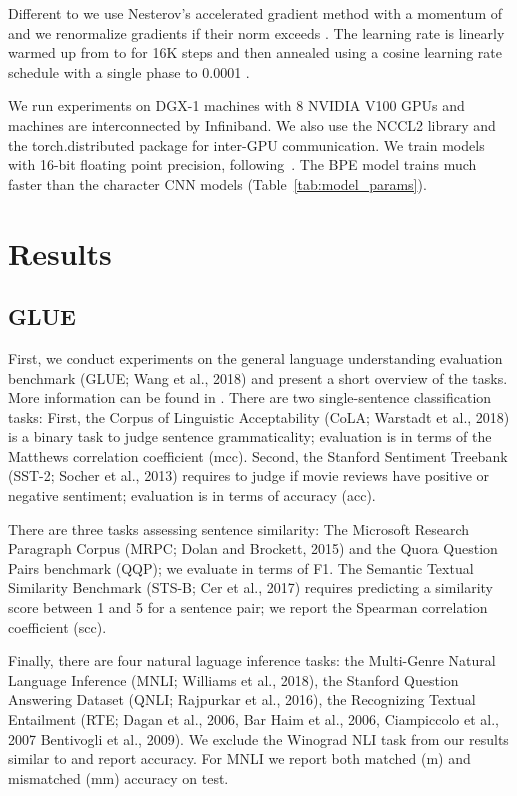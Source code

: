\documentclass[11pt,a4paper]{article}
\begin{document}
Different to \citet{vaswani2017transformer} we use Nesterov's accelerated gradient method \citep{sutskever2013icml} with a momentum of  and we renormalize gradients if their norm exceeds  \citep{pascanu2013difficulty}.
The learning rate is linearly warmed up from  to  for 16K steps and then annealed using a cosine learning rate schedule with a single phase to 0.0001 \citep{cosine}.

We run experiments on DGX-1 machines with 8 NVIDIA V100 GPUs and machines are interconnected by Infiniband.
We also use the NCCL2 library and the torch.distributed package for inter-GPU communication.
We train models with 16-bit floating point precision, following~\citet{ott2018scaling}.
The BPE model trains much faster than the character CNN models (Table~\ref{tab:model_params}).


\section{Results}
     
\subsection{GLUE}
\label{sec:glue}

First, we conduct experiments on the general language understanding evaluation benchmark (GLUE; Wang et al., 2018)\nocite{wang2018glue} and present a short overview of the tasks. More information can be found in \citet{wang2018glue}. 
There are two single-sentence classification tasks: 
First, the Corpus of Linguistic Acceptability (CoLA; Warstadt et al., 2018)\nocite{warstadt2018cola} is a binary task to judge sentence grammaticality; evaluation is in terms of the Matthews correlation coefficient (mcc).
Second, the Stanford Sentiment Treebank (SST-2; Socher et al., 2013)\nocite{socher2013sst2} requires to judge if movie reviews have positive or negative sentiment; evaluation is in terms of accuracy (acc).

There are three tasks assessing sentence similarity:
The Microsoft Research Paragraph Corpus (MRPC; Dolan and Brockett, 2015)\nocite{dolan2005mrpc} and the Quora Question Pairs benchmark (QQP); we evaluate in terms of F1.
The Semantic Textual Similarity Benchmark (STS-B; Cer et al., 2017)\nocite{cer2017stsb} requires predicting a similarity score between 1 and 5 for a sentence pair; we report the Spearman correlation coefficient (scc).

Finally, there are four natural laguage inference tasks: the Multi-Genre Natural Language Inference (MNLI; Williams et al., 2018)\nocite{williams2017mnli}, the Stanford Question Answering Dataset (QNLI; Rajpurkar et al., 2016)\nocite{rajpurkar2016squad}, the Recognizing Textual Entailment (RTE; Dagan et al., 2006, Bar Haim et al., 2006, Ciampiccolo et al., 2007 Bentivogli et al., 2009)\nocite{dagan2006rte1,haim2006rte2,giampiccolo2007rte3,bentivogli2009rte}. 
We exclude the Winograd NLI task from our results similar to \citet{radford2018unsup,devlin2018bert} and report accuracy. 
For MNLI we report both matched (m) and mismatched (mm) accuracy on test.
\end{document}
